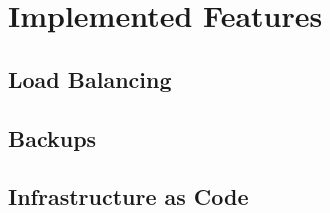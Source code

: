 \section{Implemented Features}

\subsection{Load Balancing}

\subsection{Backups}

\subsection{Infrastructure as Code}